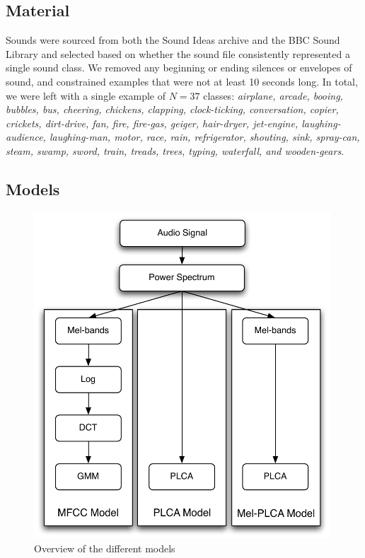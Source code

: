 \subsection{Material}
Sounds were sourced from both the Sound Ideas archive and the BBC Sound Library and selected based on whether the sound file consistently represented a single sound class.  We removed any beginning or ending silences or envelopes of sound, and constrained examples that were not at least 10 seconds long.  In total, we were left with a single example of $N = 37$ classes: \textit{airplane, arcade, booing, bubbles, bus, cheering, chickens, clapping, clock-ticking, conversation, copier, crickets, dirt-drive, fan, fire, fire-gas, geiger, hair-dryer, jet-engine, laughing-audience, laughing-man, motor, race, rain, refrigerator, shouting, sink, spray-can, steam, swamp, sword, train, treads, trees, typing, waterfall, and wooden-gears}.  

\subsection{Models}

\begin{figure}
\centering
\includegraphics[width=0.99\textwidth]{images/models.pdf}
\caption{Overview of the different models}
\label{fig:models}
\end{figure}


